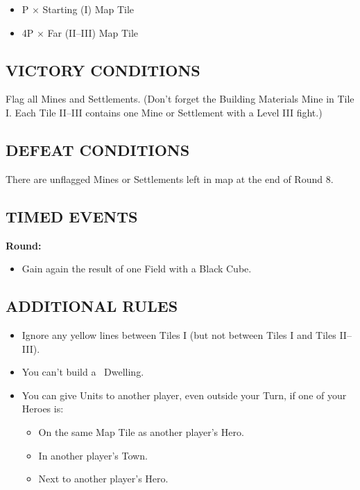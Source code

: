 \begin{multicols*}{2}
\begin{itemize}
  \item P × Starting (I) Map Tile
  \item 4P × Far (II--III) Map Tile
\end{itemize}

\subsection*{\MakeUppercase{Victory Conditions}}

Flag all Mines and Settlements. (Don't forget the Building Materials Mine in Tile I. Each Tile II--III contains one Mine or Settlement with a Level III fight.)

\subsection*{\MakeUppercase{Defeat Conditions}}

There are unflagged Mines or Settlements left in map at the end of Round 8.

\subsection*{\MakeUppercase{Timed Events}}

\textbf{ Round:}
\begin{itemize}
  \item Gain again the result of one Field with a Black Cube.
\end{itemize}

\subsection*{\MakeUppercase{Additional Rules}}

\begin{itemize}
    \item Ignore any yellow lines between Tiles I (but not between Tiles I and Tiles II--III).

    \item You can't build a \golden\ Dwelling.

    \item You can give Units to another player, even outside your Turn, if one of your Heroes is:
    \begin{itemize}
        \item On the same Map Tile as another player's Hero.
        \item In another player's Town.
        \item Next to another player's Hero.
    \end{itemize}


\end{itemize}
\end{multicols*}
